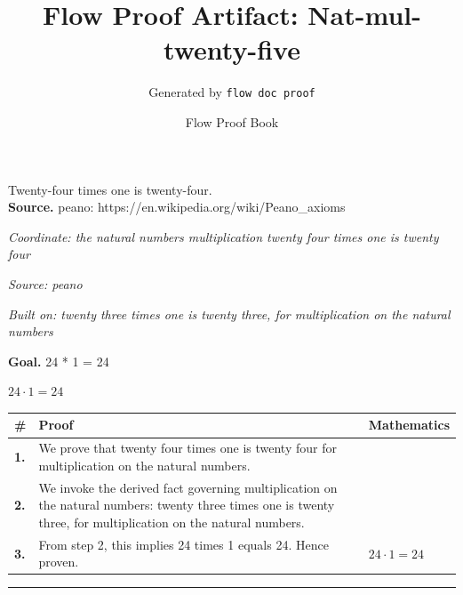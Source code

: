 \documentclass[11pt]{article}
\title{Flow Proof Artifact: Nat-mul-twenty-five}
\author{Generated by \texttt{flow doc proof}}
\date{Flow Proof Book}
\theoremstyle{definition}
\begin{document}
\maketitle
Twenty-four times one is twenty-four.\\[0.5em]
\textbf{Source.} peano: https://en.wikipedia.org/wiki/Peano\_axioms\\[0.5em]
\bigskip
{}\par
\smallskip\noindent\textit{Coordinate: the natural numbers \cdot multiplication \cdot twenty four times one is twenty four}\par
\smallskip\noindent\textit{Source: peano}\par
\smallskip\noindent\textit{Built on: twenty three times one is twenty three, for multiplication on the natural numbers}\par
\medskip
\noindent\textbf{Goal.} 24 * 1 = 24\par
\noindent$\displaystyle 24 \cdot 1 = 24$\par
\medskip
\noindent
\begin{tabular}{@{} >{\raggedright\arraybackslash}p{} >{\raggedright\arraybackslash}p{} >{\raggedleft\arraybackslash}p{} @{}}
\textbf{\#} & \textbf{Proof} & \textbf{Mathematics} \\
\midrule
\textbf{1.} & We prove that twenty four times one is twenty four for multiplication on the natural numbers. & \\[0.45em]
\textbf{2.} & We invoke the derived fact governing multiplication on the natural numbers: twenty three times one is twenty three, for multiplication on the natural numbers. & \\[0.45em]
\textbf{3.} & From step 2, this implies 24 times 1 equals 24. Hence proven. & $\displaystyle 24 \cdot 1 = 24$ \\[0.45em]
\bottomrule
\end{tabular}
\label{thm:Nat-multiplication-twenty_four_times_one_is_twenty_four}
\par\medskip\hrule
\end{document}
